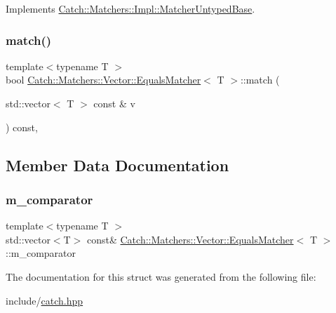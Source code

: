 Implements \mbox{\hyperlink{class_catch_1_1_matchers_1_1_impl_1_1_matcher_untyped_base_a91d3a907dbfcbb596077df24f6e11fe2}{Catch\+::\+Matchers\+::\+Impl\+::\+Matcher\+Untyped\+Base}}.

\mbox{\label{struct_catch_1_1_matchers_1_1_vector_1_1_equals_matcher_a2d96cca58a44151fddc5257eda3305da}} 
\subsubsection{\texorpdfstring{match()}{match()}}
{\footnotesize\ttfamily template$<$typename T $>$ \\
bool \mbox{\hyperlink{struct_catch_1_1_matchers_1_1_vector_1_1_equals_matcher}{Catch\+::\+Matchers\+::\+Vector\+::\+Equals\+Matcher}}$<$ T $>$\+::match (\begin{DoxyParamCaption}\item[{std\+::vector$<$ T $>$ const \&}]{v }\end{DoxyParamCaption}) const\hspace{0.3cm}{\ttfamily [inline]}, {\ttfamily [override]}}



\subsection{Member Data Documentation}
\mbox{\label{struct_catch_1_1_matchers_1_1_vector_1_1_equals_matcher_a56f7aa6f110a12b1b9aeb0cabbc9d755}} 
\subsubsection{\texorpdfstring{m\_comparator}{m\_comparator}}
{\footnotesize\ttfamily template$<$typename T $>$ \\
std\+::vector$<$T$>$ const\& \mbox{\hyperlink{struct_catch_1_1_matchers_1_1_vector_1_1_equals_matcher}{Catch\+::\+Matchers\+::\+Vector\+::\+Equals\+Matcher}}$<$ T $>$\+::m\+\_\+comparator}



The documentation for this struct was generated from the following file\+:\begin{DoxyCompactItemize}
\item 
include/\mbox{\hyperlink{catch_8hpp}{catch.\+hpp}}\end{DoxyCompactItemize}
